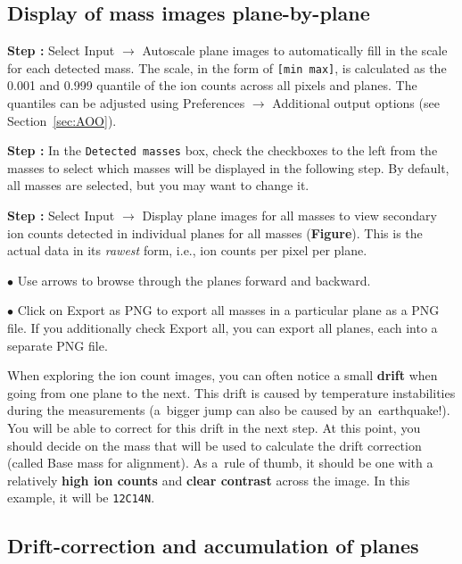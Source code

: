 \documentclass[a4paper, 11pt]{article}
\newcommand{\ttt}[1]{\texttt{#1}}
\newcommand{\lans}[1]{{\color{magenta}#1}}
\newcommand{\lanscb}[1]{{\color{darkgreen}#1}}
\newcommand{\lanstf}[1]{{\color{cyan}#1}}
\newcommand\ra{\rightarrow}
\newcommand\figref[0]{\textbf{Figure}}
\newcounter{step}
\newcommand\s{\addtocounter{step}{1}\noindent\textbf{Step \thestep:}{ }}
\newcommand\bul{\noindent$\bullet${ }}
\newcommand\bb[1]{\textbf{#1}}
\begin{document}

\subsection{Display of mass images plane-by-plane}

\setcounter{step}{0}

\s Select \lans{Input} $\ra$ \lans{Autoscale plane images} to automatically fill in the \lanstf{scale} for each detected mass. The scale, in the form of \ttt{[min max]}, is calculated as the 0.001 and 0.999 quantile of the ion counts across all pixels and planes. The quantiles can be adjusted using \lans{Preferences} $\ra$ \lans{Additional output options} (see Section~\ref{sec:AOO}). 

\s In the \ttt{Detected masses} box, check the \lanscb{checkboxes}  to the left from the \lanstf{masses} to select which masses will be displayed in the following step. By default, all masses are selected, but you may want to change it.

\s Select \lans{Input} $\ra$ \lans{Display plane images for all masses} to view secondary ion counts detected in individual planes for all masses (\figref). This is the actual data in its \emph{rawest} form, i.e., ion counts per pixel per plane.

\bul Use arrows to browse through the planes forward and backward.

\bul Click on \lans{Export as PNG} to export all masses in a particular plane as a PNG file. If you additionally check \lanscb{Export all}, you can export all planes, each into a separate PNG file.


When exploring the ion count images, you can often notice a small \bb{drift} when going from one plane to the next. This drift is caused by temperature instabilities during the measurements (a~bigger jump can also be caused by an~earthquake!). You will be able to correct for this drift in the next step. At this point, you should decide on the mass that will be used to calculate the drift correction (called \lanstf{Base mass for alignment}). As a~rule of thumb, it should be one with a relatively \bb{high ion counts} and \bb{clear contrast} across the image. In this example, it will be \ttt{12C14N}.


\subsection{Drift-correction and accumulation of planes}
\setcounter{step}{0}
\end{document}
